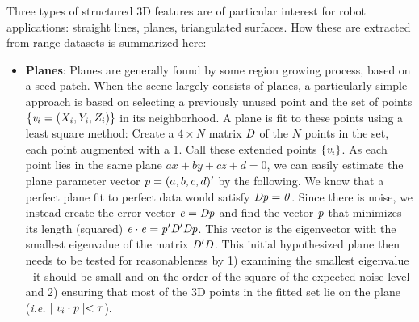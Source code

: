 \documentclass[twocolumn,oneside]{book}
\begin{document}
Three
 types of structured 3D features are of particular interest for robot
applications: 
straight lines, planes, triangulated surfaces.
How these are extracted from range datasets is summarized here:

\begin{itemize}

%
%
%


\item {\bf Planes}: 
Planes are generally found by some region growing process, based on a seed patch.
When the scene largely consists of planes, a
particularly simple approach is based on selecting a previously unused
point and the set of points $\{{\bf \it v}_i =(X_i,Y_i,Z_i)\}$ in its neighborhood. 
A plane is fit to these points using a least square method:
Create a $4 \times N$ matrix ${\bf \it D}$ of the $N$ points in the set, each point
augmented with a 1.
Call these extended points $\{ {\bf \it v}_i \}$.
As each point lies in the same plane $a x + b y + c z + d = 0$, we can easily
estimate the plane parameter vector ${\bf \it p} = (a,b,c,d)'$ by the following.
We know that a perfect plane fit to perfect data would satisfy ${\bf \it D}{\bf \it p} = {\bf \it 0}$.
Since there is noise, we instead create the error vector ${\bf \it e}={\bf \it D}{\bf \it p}$ 
and find the vector ${\bf \it p}$ that minimizes its length (squared) ${\bf \it e} \cdot {\bf \it e} = {\bf \it p}'{\bf \it D}'{\bf \it D}{\bf \it p}$.
This vector is the eigenvector with the smallest eigenvalue of the
matrix ${\bf \it D}'{\bf \it D}$.
This initial hypothesized plane then needs to be tested for reasonableness by
1) examining the smallest eigenvalue - it should be small and on the 
order of the square of the expected noise level and 2) ensuring that most of the
3D points in the fitted set lie on the plane ({\it i.e.} $\mid {\bf \it v}_i \cdot {\bf \it p} \mid < \tau$).


\end{itemize}
\end{document}
